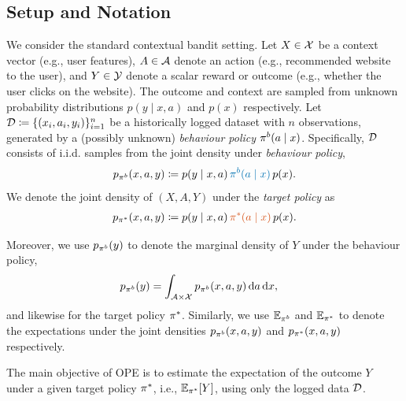 \subsection{Setup and Notation} \label{sec:setup_notation}
We consider the standard contextual bandit setting. Let $X\in\mathcal{X}$ be a context vector (e.g., user features), $A\in \mathcal{A}$ denote an action (e.g., recommended website to the user), and $Y\in \mathcal{Y}$ denote a scalar reward or outcome (e.g., whether the user clicks on the website). The outcome and context are sampled from unknown probability distributions $p(y\mid x, a)$ and $p(x)$ respectively. Let $\mathcal{D}\coloneqq \{(x_i, a_i, y_i)\}_{i=1}^n$ be a historically logged dataset with $n$ observations, generated by a (possibly unknown) \emph{behaviour policy} $\pi^b(a\mid x)$.
Specifically, $\mathcal{D}$ consists of i.i.d. samples from the joint density under\textit{ behaviour policy},
\begin{align}
    \pbeh(x, a, y) \coloneqq p(y\mid x, a)\, \textcolor{blue}{\beh(a\mid x)}\,p(x). \label{eq:behav-joint-factorisation}
\end{align}
We denote the joint density of $(X, A, Y)$ under the \textit{target policy} as
\begin{align}
    \ptar(x, a, y) \coloneqq p(y\mid x, a)\, \textcolor{red}{\tar(a\mid x)}\,p(x). \label{eq:tar-joint-factorisation}
\end{align}

Moreover, we use $p_{\pi^b}(y)$ to denote the marginal density of $Y$ under the behaviour policy, 
\begin{align*}
    p_{\pi^b}(y) &= \int_{\mathcal{A} \times \mathcal{X}} p_{\pi^b}(x, a, y)\, \mathrm{d}a \, \mathrm{d}x,
\end{align*}
and likewise for the target policy $\pi^*$. Similarly, we use $\mathbb{E}_{\pi^b}$ and $\mathbb{E}_{\pi^*}$ to denote the expectations under the joint densities $p_{\pi^b}(x, a, y)$ and $p_{\pi^*}(x, a, y)$ respectively.


The main objective of OPE is to estimate the expectation of the outcome $Y$ under a given target policy $\pi^*$, i.e., $\mathbb{E}_{\pi^*} [Y]$, using only the logged data $\mathcal{D}$.


